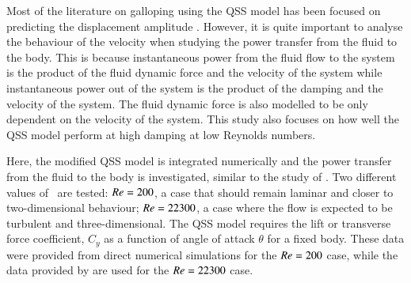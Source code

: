 Most of the literature on galloping using the QSS model has been focused on predicting the displacement amplitude \citep{Parkinson1964,Joly2012,Luo2003}. However, it is quite important to analyse the behaviour of the velocity when studying the power transfer from the fluid to the body. This is because instantaneous power from the fluid flow to the system is the product of the fluid dynamic force and the velocity of the system while instantaneous power out of the system is the product of the damping and the velocity of the system. The fluid dynamic force is also modelled to be only dependent on the velocity of the system. This study also focuses on how well the QSS model perform at high damping at low Reynolds numbers. 

Here, the modified QSS model is integrated numerically and the power transfer from the fluid to the body is investigated, similar to the study of \citet{Barrero-Gil2010a}. Two different values of \reynoldsnumber \ are tested: $Re = 200$, a case that should remain laminar and closer to two-dimensional behaviour; $Re = 22300$, a case where the flow is expected to be turbulent and three-dimensional. The QSS model requires the lift or transverse force coefficient, $C_y$ as a function of angle of attack $\theta$ for a fixed body. These data were provided from direct numerical simulations for the $Re = 200$ case, while the data provided by \citet{Parkinson1964} are used for the $Re = 22300$ case.

